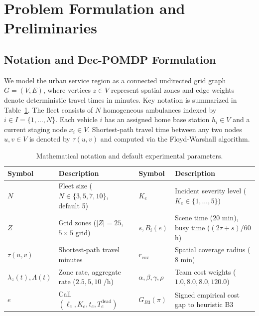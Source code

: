 \documentclass{article}
\begin{document}
\section{Problem Formulation and Preliminaries}
\subsection{Notation and Dec-POMDP Formulation}
We model the urban service region as a connected undirected grid graph $G=(V, E)$, where vertices $z \in V$ represent spatial zones and edge weights denote deterministic travel times in minutes. Key notation is summarized in Table~\ref{tab:notation}. The fleet consists of $N$ homogeneous ambulances indexed by $i \in I = \{1, \ldots, N\}$. Each vehicle $i$ has an assigned home base station $h_i \in V$ and a current staging node $x_i \in V$. Shortest-path travel time between any two nodes $u, v \in V$ is denoted by $\tau(u, v)$ and computed via the Floyd-Warshall algorithm.

\begin{table}[h]
\centering\scriptsize
\setlength{\tabcolsep}{4pt}
\caption{Mathematical notation and default experimental parameters.}
\label{tab:notation}
\begin{tabular}{ll|ll}
\toprule
Symbol & Description & Symbol & Description \\
\midrule
$N$ & Fleet size ($N \in \{3,5,7,10\}$, default 5) & $K_e$ & Incident severity level ($K_e \in \{1,\ldots,5\}$) \\
$Z$ & Grid zones ($|Z|=25$, $5\times 5$ grid) & $s, B_i(e)$ & Scene time ($20$ min), busy time ($(2\tau + s)/60$ h) \\
$\tau(u, v)$ & Shortest-path travel minutes & $r_{\mathrm{cov}}$ & Spatial coverage radius ($8$ min) \\
$\lambda_z(t), \Lambda(t)$ & Zone rate, aggregate rate ($2.5, 5, 10$ /h) & $\alpha, \beta, \gamma, \rho$ & Team cost weights ($1.0, 8.0, 8.0, 120.0$) \\
$e$ & Call $(\ell_e, K_e, t_e, T_e^{\mathrm{dead}})$ & $G_{B3}(\pi)$ & Signed empirical cost gap to heuristic B3 \\
\bottomrule
\end{tabular}
\end{table}
\end{document}

